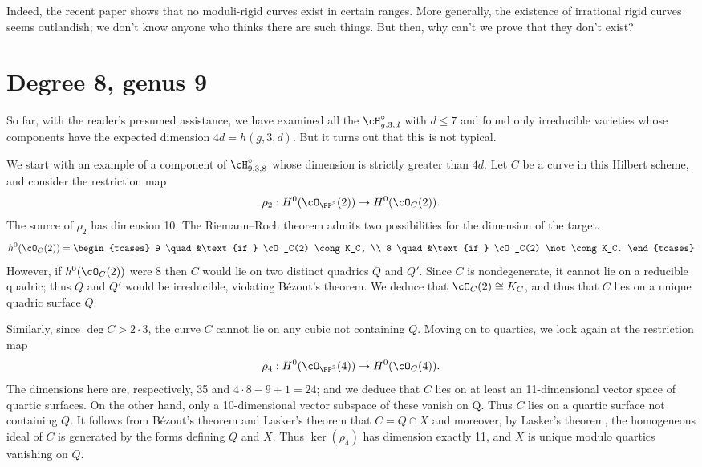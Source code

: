 Indeed, the recent paper \cite{MR3980289} shows that no moduli-rigid
curves
exist in certain ranges. More generally,  the existence of irrational
rigid curves seems outlandish; we don't know anyone who thinks there
are such things. But then, why can't we prove that they don't exist?



\section{Degree 8, genus 9}\label{degree 8 section}

So far, with the reader's presumed assistance, we have examined all the
$\cH^\circ_{g,3,d}$ with $d\leq 7$
and found only irreducible varieties whose components have the expected
dimension $4d = h(g,3,d)$. But it turns out that
this is not typical.

We start with an example of a component of $\cH^\circ_{9,3,8}$ whose
%
dimension is strictly greater than $4d$.  Let $C$ be  a curve in this
Hilbert scheme, and consider the restriction map
$$
\rho_2 : H^0(\cO_{\PP^3}(2)) \to H^0(\cO_C(2)).
$$
The source of $\rho_2$ has dimension 10. The Riemann--Roch theorem admits
two possibilities for the dimension
of the target.
$$
h^0(\cO_C(2)) =
\begin{tcases}
9 \quad &\text{if } \cO_C(2) \cong K_C, \\
8 \quad &\text{if } \cO_C(2) \not\cong K_C.
\end{tcases}
$$
However, if $h^0(\cO_C(2))$ were 8 then $C$ would  lie on two distinct
quadrics $Q$ and $Q'$. Since $C$ is nondegenerate, it cannot lie on a
reducible quadric; thus $Q$ and $Q'$ would  be irreducible,  violating
B\'ezout's theorem. We deduce that $\cO_C(2) \cong K_C$, and thus that
$C$ lies on a unique quadric surface $Q$.

Similarly, since $\deg C > 2\cdot 3$, the curve $C$ cannot lie on any
cubic not containing $Q$. Moving on to quartics, we look again at the
restriction map
$$
\rho_4 : H^0(\cO_{\PP^3}(4)) \to H^0(\cO_C(4)).
$$
The dimensions here are, respectively, 35 and $4\cdot 8 - 9 + 1 = 24$;
and we deduce that $C$ lies on at least an 11-dimensional vector space
of quartic surfaces. On the other hand, only a 10-dimensional vector
subspace of these vanish on Q. Thus $C$ lies on a quartic surface not
containing $Q$. It follows from B\'ezout's theorem and
Lasker's theorem that  $C = Q \cap X$
and moreover, by Lasker's theorem, the homogeneous ideal of $C$ is
generated by the forms defining $Q$ and $X$. Thus $\ker(\rho_4)$ has
dimension exactly 11, and  $X$ is unique modulo quartics vanishing on $Q$.

